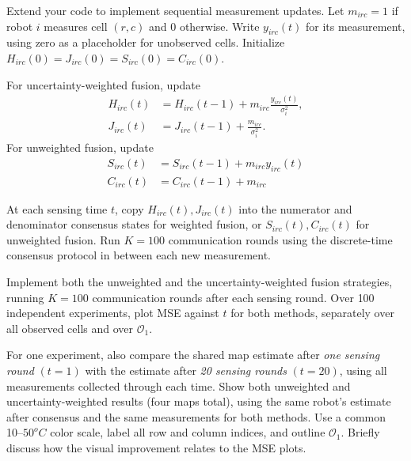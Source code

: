 \documentclass[12pt]{article}
\begin{document}
Extend your code to implement sequential measurement updates. Let $m_{irc}=1$ if robot $i$ measures cell $(r,c)$ and 0 otherwise. Write $y_{irc}(t)$ for its measurement, using zero as a placeholder for unobserved cells. Initialize $H_{irc}(0)=J_{irc}(0)=S_{irc}(0)=C_{irc}(0)$.

For uncertainty-weighted fusion, update
\begin{align*}
    H_{irc}(t)&=H_{irc}(t-1)+m_{irc}\frac{y_{irc}(t)}{\sigma_i^2},\\
    J_{irc}(t)&=J_{irc}(t-1)+\frac{m_{irc}}{\sigma_i^2}.
\end{align*}
For unweighted fusion, update
\begin{align*}
    S_{irc}(t)&=S_{irc}(t-1)+m_{irc}y_{irc}(t)\\
    C_{irc}(t)&=C_{irc}(t-1)+m_{irc}
\end{align*}

At each sensing time $t$, copy $H_{irc}(t), J_{irc}(t)$ into the numerator and denominator consensus states for weighted fusion, or $S_{irc}(t), C_{irc}(t)$ for unweighted fusion. Run $K=100$ communication rounds using the discrete-time consensus protocol in between each new measurement. 

Implement both the unweighted and the uncertainty-weighted fusion strategies, running $K=100$ communication rounds after each sensing round. Over 100 independent experiments, plot MSE against $t$ for both methods, separately over all observed cells and over $\mathcal O_1$.

For one experiment, also compare the shared map estimate after \textit{one sensing round} $(t=1)$ with the estimate after \textit{20 sensing rounds} $(t=20)$, using all measurements collected through each time. Show both unweighted and uncertainty-weighted results (four maps total), using the same robot's estimate after consensus and the same measurements for both methods. Use a common 10--$50^oC$ color scale, label all row and column indices, and outline $\mathcal O_1$. Briefly discuss how the visual improvement relates to the MSE plots.
\end{document}
